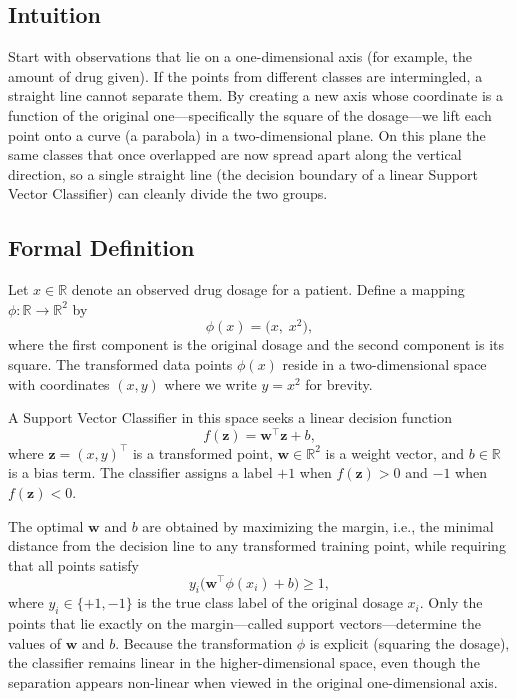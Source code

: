 \documentclass[12pt, a4paper]{article}
\begin{document}
\subsection{Intuition}
Start with observations that lie on a one-dimensional axis (for example, the amount of drug given). If the points from different classes are intermingled, a straight line cannot separate them. By creating a new axis whose coordinate is a function of the original one---specifically the square of the dosage---we lift each point onto a curve (a parabola) in a two-dimensional plane. On this plane the same classes that once overlapped are now spread apart along the vertical direction, so a single straight line (the decision boundary of a linear Support Vector Classifier) can cleanly divide the two groups.

\subsection{Formal Definition}
Let \(x\in\mathbb{R}\) denote an observed drug dosage for a patient.  
Define a mapping \(\phi : \mathbb{R}\rightarrow\mathbb{R}^2\) by  
\[
\phi(x)=\bigl( x,\; x^{2}\bigr),
\] 
where the first component is the original dosage and the second component is its square.  
The transformed data points \(\phi(x)\) reside in a two-dimensional space with coordinates \((x, y)\) where we write \(y = x^{2}\) for brevity.

A Support Vector Classifier in this space seeks a linear decision function
\[
f(\mathbf{z}) = \mathbf{w}^{\top}\mathbf{z}+b,
\]
where \(\mathbf{z} = (x, y)^{\top}\) is a transformed point, \(\mathbf{w}\in\mathbb{R}^2\) is a weight vector, and \(b\in\mathbb{R}\) is a bias term.  
The classifier assigns a label \(+1\) when \(f(\mathbf{z})>0\) and \(-1\) when \(f(\mathbf{z})<0\).  

The optimal \(\mathbf{w}\) and \(b\) are obtained by maximizing the margin, i.e., the minimal distance from the decision line to any transformed training point, while requiring that all points satisfy
\[
y_i \bigl(\mathbf{w}^{\top}\phi(x_i)+b\bigr)\ge 1,
\]
where \(y_i\in\{+1,-1\}\) is the true class label of the original dosage \(x_i\).  
Only the points that lie exactly on the margin---called support vectors---determine the values of \(\mathbf{w}\) and \(b\). Because the transformation \(\phi\) is explicit (squaring the dosage), the classifier remains linear in the higher-dimensional space, even though the separation appears non-linear when viewed in the original one-dimensional axis.
\end{document}

